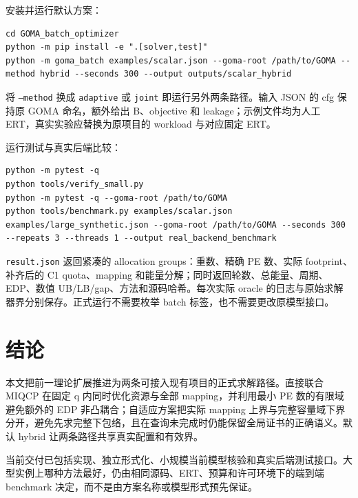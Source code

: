\documentclass[UTF8,11pt,a4paper,fontset=fandol]{ctexart}
\theoremstyle{remark}\newtheorem{remark}[proposition]{说明}
\numberwithin{equation}{section}
\begin{document}
安装并运行默认方案：
\begin{Verbatim}[fontsize=\small,breaklines=true]
cd GOMA_batch_optimizer
python -m pip install -e ".[solver,test]"
python -m goma_batch examples/scalar.json --goma-root /path/to/GOMA --method hybrid --seconds 300 --output outputs/scalar_hybrid
\end{Verbatim}
将 \texttt{--method} 换成 \texttt{adaptive} 或 \texttt{joint} 即运行另外两条路径。输入 JSON 的 cfg 保持原 GOMA 命名，额外给出 B、objective 和 leakage；示例文件均为人工 ERT，真实实验应替换为原项目的 workload 与对应固定 ERT。

运行测试与真实后端比较：
\begin{Verbatim}[fontsize=\small,breaklines=true]
python -m pytest -q
python tools/verify_small.py
python -m pytest -q --goma-root /path/to/GOMA
python tools/benchmark.py examples/scalar.json examples/large_synthetic.json --goma-root /path/to/GOMA --seconds 300 --repeats 3 --threads 1 --output real_backend_benchmark
\end{Verbatim}

\texttt{result.json} 返回紧凑的 allocation groups：重数、精确 PE 数、实际 footprint、补齐后的 C1 quota、mapping 和能量分解；同时返回轮数、总能量、周期、EDP、数值 UB/LB/gap、方法和源码哈希。每次实际 oracle 的日志与原始求解器界分别保存。正式运行不需要枚举 batch 标签，也不需要更改原模型接口。

\section{结论}
本文把前一理论扩展推进为两条可接入现有项目的正式求解路径。直接联合 MIQCP 在固定 q 内同时优化资源与全部 mapping，并利用最小 PE 数的有限域避免额外的 EDP 非凸耦合；自适应方案把实际 mapping 上界与完整容量域下界分开，避免先求完整下包络，且在查询未完成时仍能保留全局证书的正确语义。默认 hybrid 让两条路径共享真实配置和有效界。

当前交付已包括实现、独立形式化、小规模当前模型核验和真实后端测试接口。大型实例上哪种方法最好，仍由相同源码、ERT、预算和许可环境下的端到端 benchmark 决定，而不是由方案名称或模型形式预先保证。
\end{document}
